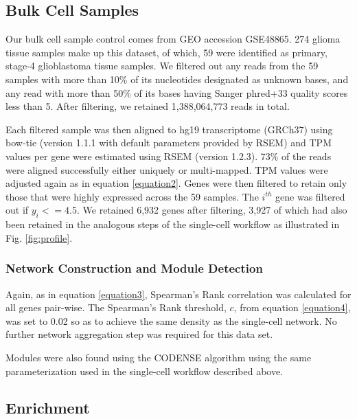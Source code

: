 \documentclass[10pt,letterpaper]{article}
\begin{document}
\subsection{Bulk Cell Samples}
Our bulk cell sample control comes from GEO accession GSE48865. 274 glioma tissue samples make up this dataset, of which, 59 were identified as primary, stage-4 glioblastoma tissue samples. We filtered out any reads from the 59 samples with more than 10\% of its nucleotides designated as unknown bases, and any read with more than 50\% of its bases having Sanger phred+33 quality scores less than 5. After filtering, we retained 1,388,064,773 reads in total. 

Each filtered sample was then aligned to hg19 transcriptome (GRCh37) using bow-tie (version 1.1.1 with default parameters provided by RSEM) and TPM values per gene were estimated using RSEM (version 1.2.3). 73\% of the reads were aligned successfully either uniquely or multi-mapped. 
TPM values were adjusted again as in equation \ref{equation2}. Genes were then filtered to retain only those that were highly expressed across the 59 samples. The $i^{th}$ gene was filtered out if $y_{i} <= 4.5$. We retained 6,932 genes after filtering, 3,927 of which had also been retained in the analogous steps of the single-cell workflow as illustrated in Fig. \ref{fig:profile}.


\subsubsection{Network Construction and Module Detection}

Again, as in equation \ref{equation3}, Spearman’s Rank correlation was calculated for all genes pair-wise. The Spearman's Rank threshold, $c$, from equation \ref{equation4}, was set to 0.02 so as to achieve the same density as the single-cell network. No further network aggregation step was required for this data set. 

Modules were also found using the CODENSE algorithm using the same parameterization used in the single-cell workflow described above.

\subsection{Enrichment}
\end{document}
